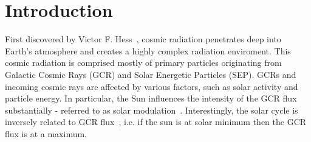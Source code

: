 \section{Introduction}
\label{Introduction}
First discovered by Victor F. Hess~\cite{hess}, cosmic radiation penetrates deep into Earth's atmosphere and creates a highly complex radiation enviroment.  This cosmic radiation is comprised mostly of primary particles originating from Galactic Cosmic Rays (GCR) and Solar Energetic Particles (SEP).  GCRs and incoming cosmic rays are affected by various factors, such as solar activity and particle energy.
In particular, the Sun influences the intensity of the GCR flux substantially - referred to as solar modulation~\cite{abe}.  Interestingly, the solar cycle is inversely related to GCR flux~\cite{hathaway}, i.e. if the sun is at solar minimum then the GCR flux is at a maximum.  

